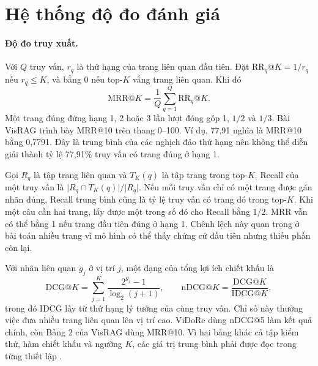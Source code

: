 \section{Hệ thống độ đo đánh giá}
\label{sec:exp_metrics}

\paragraph{Độ đo truy xuất.}
Với $Q$ truy vấn, $r_q$ là thứ hạng của trang liên quan đầu tiên.
Đặt $\mathrm{RR}_q@K=1/r_q$ nếu $r_q\le K$, và bằng 0 nếu top-$K$
vắng trang liên quan. Khi đó
\begin{equation}
    \mathrm{MRR}@K=\frac{1}{Q}\sum_{q=1}^{Q}\mathrm{RR}_q@K.
    \label{eq:tv2_mrr}
\end{equation}
Một trang đúng đứng hạng 1, 2 hoặc 3 lần lượt đóng góp 1,
$1/2$ và $1/3$. Bài VisRAG trình bày MRR@10 trên thang 0--100.
Ví dụ, 77,91 nghĩa là MRR@10 bằng 0,7791. Đây là trung bình của
các nghịch đảo thứ hạng nên không thể diễn giải thành tỷ lệ
77,91\% truy vấn có trang đúng ở hạng 1.

Gọi $R_q$ là tập trang liên quan và $T_K(q)$ là tập trang trong
top-$K$. Recall của một truy vấn là
$\lvert R_q\cap T_K(q)\rvert/\lvert R_q\rvert$.
Nếu mỗi truy vấn chỉ có một trang được gán nhãn đúng, Recall
trung bình cũng là tỷ lệ truy vấn có trang đó trong top-$K$.
Khi một câu cần hai trang, lấy được một trong số đó cho
Recall bằng $1/2$. MRR vẫn có thể bằng 1 nếu trang đầu tiên
đúng ở hạng 1. Chênh lệch này quan trọng ở bài toán nhiều trang
vì mô hình có thể thấy chứng cứ đầu tiên nhưng thiếu phần còn lại.

Với nhãn liên quan $g_j$ ở vị trí $j$, một dạng của tổng lợi ích
chiết khấu là
\begin{equation}
    \mathrm{DCG}@K = \sum_{j=1}^{K}
    \frac{2^{g_j}-1}{\log_2(j+1)},
    \qquad
    \mathrm{nDCG}@K = \frac{\mathrm{DCG}@K}{\mathrm{IDCG}@K},
    \label{eq:tv2_ndcg}
\end{equation}
trong đó $\mathrm{IDCG}$ lấy từ thứ hạng lý tưởng của cùng truy
vấn. Chỉ số này thưởng việc đưa nhiều trang liên quan lên vị trí
cao. ViDoRe dùng nDCG@5 làm kết quả chính, còn Bảng 2 của VisRAG
dùng MRR@10. Vì hai bảng khác cả tập kiểm thử, hàm chiết khấu
và ngưỡng $K$, các giá trị trung bình phải được đọc trong
từng thiết lập \cite{faysse2025colpali,yu2025visrag}.

